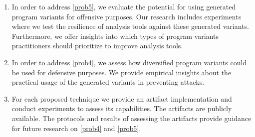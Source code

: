 \begin{enumerate}[label=\textbf{C\arabic*}, ref=C\arabic*]

	\item \label{ofensivecontrib}  
	In order to address \ref{prob5}, we evaluate the potential for using generated \Wasm program variants for offensive purposes. 
	Our research includes experiments where we test the resilience of \Wasm analysis tools against these generated variants. 
	Furthermore, we offer insights into which types of program variants practitioners should prioritize to improve \Wasm analysis tools.

	\item \label{defensivecontrib}  In order to address \ref{prob4}, we assess how diversified \Wasm program variants could be used for defensive purposes. We provide empirical insights about the practical usage of the generated variants in preventing attacks.
	

	\item \label{methodcontrib}  For each proposed technique we provide an artifact implementation and conduct experiments to assess its capabilities. The artifacts are publicly available. The protocols and results of assessing the artifacts provide guidance for future research on \ref{prob4} and \ref{prob5}.
	
	
	

	
\end{enumerate}

